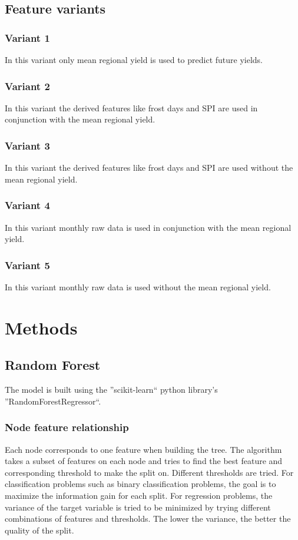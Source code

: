 \documentclass{article}
\begin{document}
\subsection{Feature variants}
\subsubsection{Variant 1}
In this variant only mean regional yield is used to predict future yields.
\subsubsection{Variant 2}
In this variant the derived features like frost days and SPI are used in conjunction with the mean regional yield.
\subsubsection{Variant 3}
In this variant the derived features like frost days and SPI are used without the mean regional yield.
\subsubsection{Variant 4}
In this variant monthly raw data is used in conjunction with the mean regional yield.
\subsubsection{Variant 5}
In this variant monthly raw data is used without the mean regional yield.
\section{Methods}
\subsection{Random Forest}
The model is built using the ''scikit-learn`` python library's ''RandomForestRegressor``.
\subsubsection{Node feature relationship}
Each node corresponds to one feature when building the tree. The algorithm takes a subset of features on each node and tries to find the best feature and corresponding threshold to make the split on. Different thresholds are tried. For classification problems such as binary classification problems, the goal is to maximize the information gain for each split.
For regression problems, the variance of the target variable is tried to be minimized by trying different combinations of features and thresholds. The lower the variance, the better the quality of the split.
\end{document}
